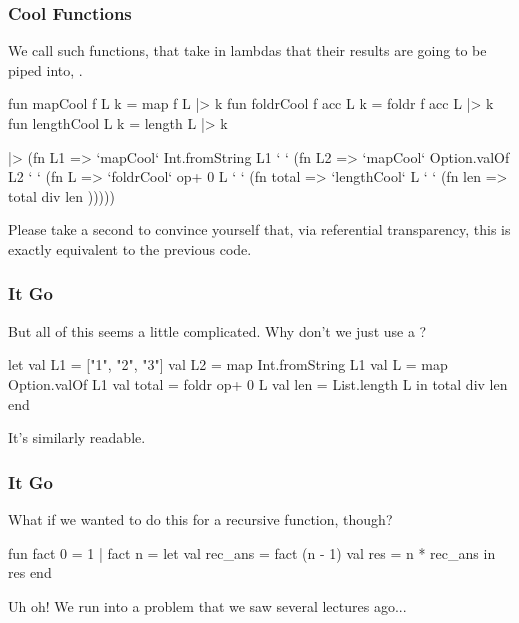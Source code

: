 \documentclass[aspectratio=169, handout]{beamer}
\begin{document}
\begin{frame}[fragile]
  \frametitle{Cool Functions}

  We call such functions, that take in lambdas that their results are going
  to be piped into, . 

  \begin{codeblock}
    fun mapCool f L k       = map f L |> k
    fun foldrCool f acc L k = foldr f acc L |> k
    fun lengthCool L k      = length L |> k
  \end{codeblock}

  \begin{codeblock}
    ["1", "2", "3"]           |> (fn L1 =>    
    `mapCool` Int.fromString L1 `  ` (fn L2 =>    
    `mapCool` Option.valOf L2   `  ` (fn L =>     
    `foldrCool` op+ 0 L         `  ` (fn total => 
    `lengthCool` L              `  ` (fn len =>   
    total div len                )))))
  \end{codeblock}

  Please take a second to convince yourself that, via referential transparency,
  this is exactly equivalent to the previous code.
\end{frame}



\begin{frame}[fragile]
  \frametitle{ It Go}

  But all of this seems a little complicated. Why don't we just use a ?

  \pause
  \begin{codeblock}
    let
      val L1    = ["1", "2", "3"]
      val L2    = map Int.fromString L1
      val L     = map Option.valOf L1
      val total = foldr op+ 0 L
      val len   = List.length L
    in
      total div len
    end
  \end{codeblock}

  \pause
  \vspace{\fill}

  It's similarly readable.\footnotemark

\end{frame}

\begin{frame}[fragile]
  \frametitle{ It Go} 

  What if we wanted to do this for a recursive function, though?

  \pause
  \vspace{\fill}

  \begin{codeblock}
    fun fact 0 = 1
      | fact n = 
        let 
          val rec_ans = fact (n - 1)
          val res = n * rec_ans
        in
          res
        end
  \end{codeblock}

  \pause
  \vspace{\fill}

  Uh oh! We run into a problem that we saw several lectures ago...
\end{frame}
\end{document}
